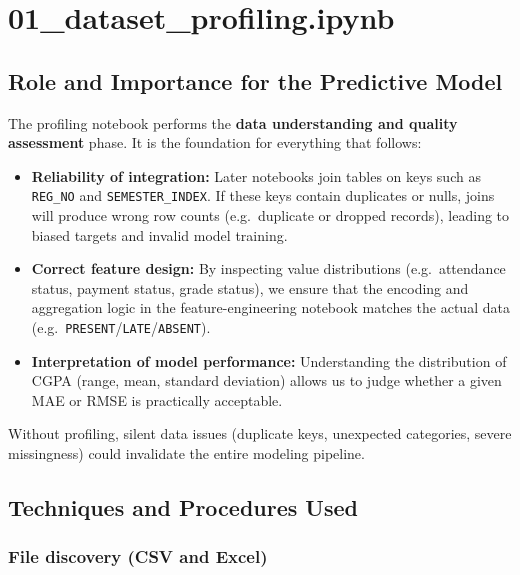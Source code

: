 \documentclass[12pt,a4paper]{article}
\begin{document}
\section{01\_dataset\_profiling.ipynb}

\subsection{Role and Importance for the Predictive Model}

The profiling notebook performs the \textbf{data understanding and quality assessment} phase. It is the foundation for everything that follows:

\begin{itemize}[leftmargin=*]
  \item \textbf{Reliability of integration:} Later notebooks join tables on keys such as \texttt{REG\_NO} and \texttt{SEMESTER\_INDEX}. If these keys contain duplicates or nulls, joins will produce wrong row counts (e.g.\ duplicate or dropped records), leading to biased targets and invalid model training.
  \item \textbf{Correct feature design:} By inspecting value distributions (e.g.\ attendance status, payment status, grade status), we ensure that the encoding and aggregation logic in the feature-engineering notebook matches the actual data (e.g.\ \texttt{PRESENT}/\texttt{LATE}/\texttt{ABSENT}).
  \item \textbf{Interpretation of model performance:} Understanding the distribution of CGPA (range, mean, standard deviation) allows us to judge whether a given MAE or RMSE is practically acceptable.
\end{itemize}

Without profiling, silent data issues (duplicate keys, unexpected categories, severe missingness) could invalidate the entire modeling pipeline.

\subsection{Techniques and Procedures Used}

\subsubsection{File discovery (CSV and Excel)}
\end{document}
